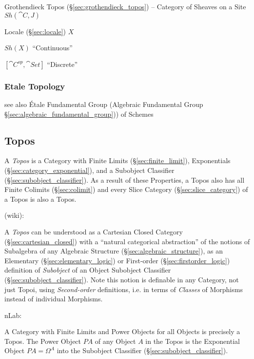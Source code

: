 Grothendieck Topos (\S\ref{sec:grothendieck_topos}) -- Category of
Sheaves on a Site $Sh(\cat{C},J)$

Locale (\S\ref{sec:locale}) $X$

$Sh(X)$ ``Continuous''

$[\cat{C}^{op},\cat{Set}]$ ``Discrete''





\subsubsection{Etale Topology}\label{sec:etale_topology}

see also \'Etale Fundamental Group (Algebraic Fundamental Group
\S\ref{sec:algebraic_fundamental_group})) of Schemes



\subsection{Topos}\label{sec:topos}

A \emph{Topos} is a Category with Finite Limits
(\S\ref{sec:finite_limit}), Exponentials
(\S\ref{sec:category_exponential}), and a Subobject Classifier
(\S\ref{sec:subobject_classifier}). As a result of these Properties, a
Topos also has all Finite Colimits (\S\ref{sec:colimit}) and every
Slice Category (\S\ref{sec:slice_category}) of a Topos is also a
Topos.

(wiki):

A \emph{Topos} can be understood as a Cartesian Closed Category
(\S\ref{sec:cartesian_closed}) with a ``natural categorical abstraction'' of
the notions of Subalgebra of any Algebraic Structure
(\S\ref{sec:algebraic_structure}), as an Elementary
(\S\ref{sec:elementary_logic}) or First-order (\S\ref{sec:firstorder_logic})
definition of \emph{Subobject} of an Object \fist Subobject Classifier
(\S\ref{sec:subobject_classifier}).
Note this notion is definable in any Category, not just Topoi, using
\emph{Second-order} definitions, i.e. in terms of \emph{Classes} of Morphisms
instead of individual Morphisms.


nLab:

A Category with Finite Limits and Power Objects for all Objects is
precisely a Topos. The Power Object $P A$ of any Object $A$ in the
Topos is the Exponential Object $P A = \Omega^A$ into the Subobject
Classifier (\S\ref{sec:subobject_classifier}).


